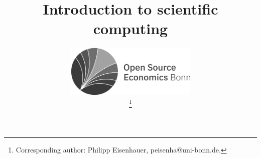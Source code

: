 \title{Introduction to scientific computing  \vspace{-0.1cm}}
\author{
	\includegraphics[height=2.5cm]{material/OSE_bonn_mdli_bw.pdf} \vspace{-1.8cm} \\ \hspace{6.1cm}
	\thanks{Corresponding author: Philipp Eisenhauer, peisenha@uni-bonn.de.}}
\date{}
